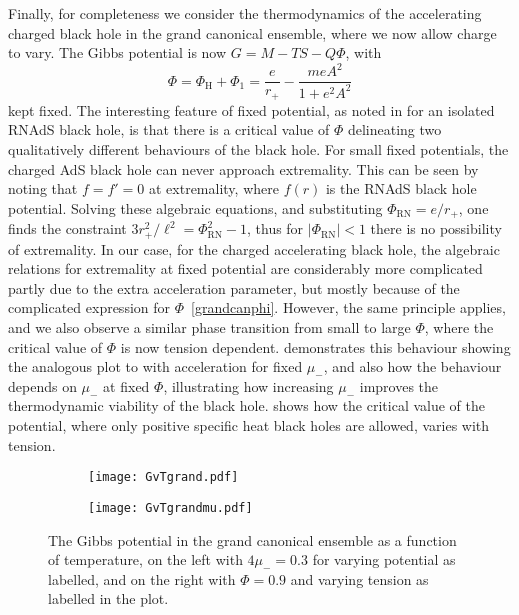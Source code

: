 \documentclass[
twoside,
openright,
frontopenright,
]{dmathesis}
\begin{document}
Finally, for completeness we consider the thermodynamics of the accelerating
charged black hole in the grand canonical ensemble, where we now allow charge to
vary. The Gibbs potential is now $G=M-TS-Q\Phi$, with
\begin{equation}
\Phi = \Phi_\mathrm{H} + \Phi_1
= \frac{e}{r_+} - \frac{meA^2}{1+e^2A^2} 
\label{grandcanphi}
\end{equation}
kept fixed. The interesting feature of fixed potential, as noted in
\cite{Chamblin:1999tk} for an isolated RNAdS black hole, is that there is a
critical value of $\Phi$ delineating two qualitatively different behaviours of
the black hole.  For small fixed potentials, the charged AdS black hole can
never approach extremality. This can be seen by noting that $f=f'=0$ at
extremality, where $f(r)$ is the RNAdS black hole potential. Solving these
algebraic equations, and substituting $\Phi_\mathrm{RN} = e/r_+$, one finds the
constraint $3r_+^2 /\ell^2= \Phi_\mathrm{RN}^2-1$, thus for
$|\Phi_\mathrm{RN}|<1$ there is no possibility of extremality. In our case, for
the charged accelerating black hole, the algebraic relations for extremality at
fixed potential are considerably more complicated partly due to the extra
acceleration parameter, but mostly because of the complicated expression for
$\Phi$~\eqref{grandcanphi}. However, the same principle applies, and we also
observe a similar phase transition from small to large $\Phi$, where the
critical value of $\Phi$ is now tension dependent. 
demonstrates this behaviour showing the analogous plot to \cite{Chamblin:1999tk}
with acceleration for fixed $\mu_-$, and also how the behaviour depends on
$\mu_-$ at fixed $\Phi$, illustrating how increasing $\mu_-$ improves the
thermodynamic viability of the black hole.   shows how
the critical value of the potential, where only positive specific heat black
holes are allowed, varies with tension.
\begin{figure}
  \centering
  \begin{subfigure}[b]{0.45\textwidth}
    \texttt{[image: GvTgrand.pdf]}
    \caption{\label{fig:granda}}
  \end{subfigure}\quad
  \begin{subfigure}[b]{0.45\textwidth}
    \texttt{[image: GvTgrandmu.pdf]}
    \caption{\label{fig:grandb}}
  \end{subfigure}
  \caption{\label{fig:grand}The Gibbs potential in the grand canonical ensemble
    as a function of temperature, on the left with $4\mu_- = 0.3$ for varying
    potential as labelled, and on the right with $\Phi=0.9$ and varying tension
    as labelled in the plot.}
\end{figure}
\end{document}
